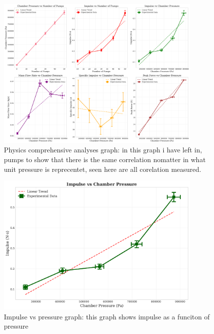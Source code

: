 \documentclass[12pt,a4paper]{article}
\begin{document}
\begin{figure}[H]
\centering
\includegraphics[width=0.9\textwidth]{physics_ia_comprehensive_analysis.pdf}
\caption{Physics comprehensive analyses graph: in this graph i have left in, pumps to show that there is the same correlation nomatter in what unit pressure is reprecentet, seen here are all corelation measured.}
\label{fig:comprehensive_analysis}
\end{figure}

\begin{figure}[H]
\centering
\includegraphics[width=0.9\textwidth]{impulse_vs_pressure.pdf}
\caption{Impulse vs pressure graph: this graph shows impulse as a funciton of pressure}
\label{fig:impulse_pressure}
\end{figure}
\end{document}
